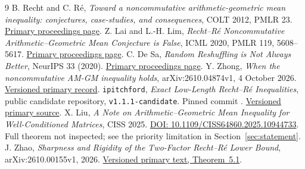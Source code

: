 \documentclass[11pt]{article}
\begin{document}
\begin{thebibliography}{9}
B. Recht and C. R\'e,
\emph{Toward a noncommutative arithmetic-geometric mean inequality:
conjectures, case-studies, and consequences}, COLT 2012, PMLR 23.
\href{https://proceedings.mlr.press/v23/recht12.html}{Primary proceedings page}.
Z. Lai and L.-H. Lim,
\emph{Recht--R\'e Noncommutative Arithmetic--Geometric Mean Conjecture
is False}, ICML 2020, PMLR 119, 5608--5617.
\href{https://proceedings.mlr.press/v119/lai20a.html}{Primary proceedings page}.
C. De Sa, \emph{Random Reshuffling is Not Always Better}, NeurIPS 33 (2020).
\href{https://proceedings.neurips.cc/paper/2020/hash/42299f06ee419aa5d9d07798b56779e2-Abstract.html}{Primary proceedings page}.
Y. Zhong, \emph{When the noncommutative AM-GM inequality holds},
arXiv:2610.04874v1, 4 October 2026.
\href{https://arxiv.org/abs/2610.04874v1}{Versioned primary record}.
\texttt{ipitchford}, \emph{Exact Low-Length Recht--R\'e Inequalities},
public candidate repository, \texttt{v1.1.1-candidate}.
Pinned commit .
\href{https://github.com/ipitchford/exact-low-length-recht-re-inequalities/tree/df3cb842014210eba99d1971be48aa079367feac}{Versioned primary source}.
X. Liu, \emph{A Note on Arithmetic--Geometric Mean Inequality for
Well-Conditioned Matrices}, CISS 2025.
\href{https://doi.org/10.1109/CISS64860.2025.10944733}{DOI: 10.1109/CISS64860.2025.10944733}.
Full theorem not inspected; see the priority limitation in Section~\ref{sec:statement}.
J. Zhao, \emph{Sharpness and Rigidity of the Two-Factor Recht--R\'e
Lower Bound}, arXiv:2610.00155v1, 2026.
\href{https://arxiv.org/html/2610.00155v1#S5}{Versioned primary text, Theorem~5.1}.
\end{thebibliography}
\end{document}
